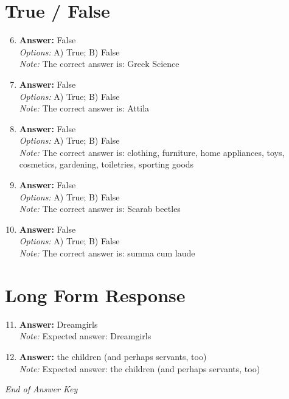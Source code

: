 \documentclass[12pt]{article}
\begin{document}
\section*{True / False}
\begin{enumerate}[label=\arabic*.]
\setcounter{enumi}{5}
\item \textbf{Answer:} False
\\ \textit{Options:} A) True; B) False
\\ \textit{Note:} The correct answer is: Greek Science
\item \textbf{Answer:} False
\\ \textit{Options:} A) True; B) False
\\ \textit{Note:} The correct answer is: Attila
\item \textbf{Answer:} False
\\ \textit{Options:} A) True; B) False
\\ \textit{Note:} The correct answer is: clothing, furniture, home appliances, toys, cosmetics, gardening, toiletries, sporting goods
\item \textbf{Answer:} False
\\ \textit{Options:} A) True; B) False
\\ \textit{Note:} The correct answer is: Scarab beetles
\item \textbf{Answer:} False
\\ \textit{Options:} A) True; B) False
\\ \textit{Note:} The correct answer is: summa cum laude
\end{enumerate}

\section*{Long Form Response}
\begin{enumerate}[label=\arabic*.]
\setcounter{enumi}{10}
\item \textbf{Answer:} Dreamgirls
\\ \textit{Note:} Expected answer: Dreamgirls
\item \textbf{Answer:} the children (and perhaps servants, too)
\\ \textit{Note:} Expected answer: the children (and perhaps servants, too)
\end{enumerate}

\vfill
\noindent\textit{End of Answer Key}
\end{document}
